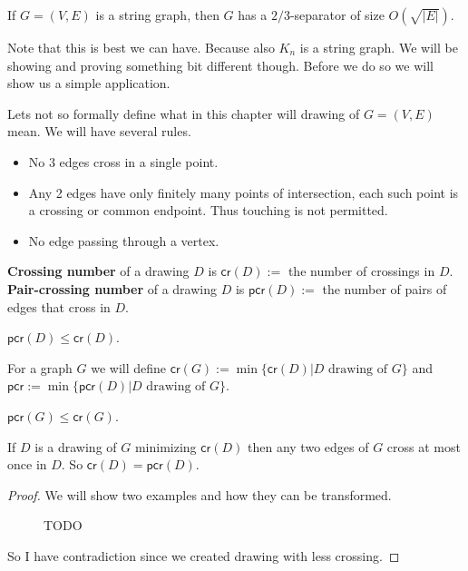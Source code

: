 \begin{thm}[Lee, 2017]
	If $G = (V,E)$ is a string graph, then $G$ has a $2/3$-separator of size $O(\sqrt{|E|})$.
	\label{lee}
\end{thm}

\noindent Note that this is best we can have. Because also $K_n$ is a string graph. We will be showing and proving something bit different though. Before we do so we will show us a simple application.

Lets not so formally define what in this chapter will drawing of $G = (V,E)$ mean. We will have several rules.

\begin{itemize}
	\item No 3 edges cross in a single point.
	\item Any 2 edges have only finitely many points of intersection, each such point is a crossing or common endpoint. Thus touching is not permitted.
	\item No edge passing through a vertex.
\end{itemize}

\newcommand{\cros}{\textsf{cr}}
\newcommand{\pcros}{\textsf{pcr}}

\begin{defn}
	\textbf{Crossing number} of a drawing $D$ is $\cros(D) :=$ the number of crossings in $D$. \textbf{Pair-crossing number} of a drawing $D$ is $\pcros(D) :=$ the number of pairs of edges that cross in $D$.
\end{defn}

\begin{observ}
	$\pcros(D) \leq \cros(D)$.
\end{observ}

For a graph $G$ we will define $\cros(G) := \min \{\cros(D) | D \text{ drawing of } G\}$ and $\pcros := \min \{\pcros(D) | D \text{ drawing of } G\}$.

\begin{observ}
	$\pcros(G) \leq \cros(G)$.
\end{observ}

\begin{lemma}
	If $D$ is a drawing of $G$ minimizing $\cros(D)$ then any two edges of $G$ cross at most once in $D$. So $\cros(D) = \pcros(D)$.
\end{lemma}

\begin{proof}
	We will show two examples and how they can be transformed.
	
	\begin{figure}
		\caption{TODO}
	\end{figure}
	
	So I have contradiction since we created drawing with less crossing.
\end{proof}

